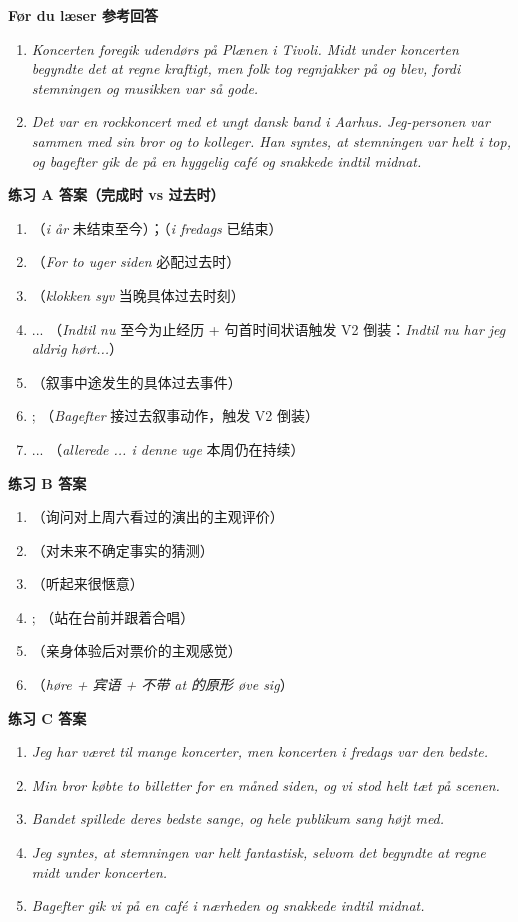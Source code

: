 \begin{answerbox}
\textbf{Før du læser 参考回答}
\begin{enumerate}
  \item \textit{Koncerten foregik udendørs på Plænen i Tivoli. Midt under koncerten begyndte det at regne kraftigt, men folk tog regnjakker på og blev, fordi stemningen og musikken var så gode.}
  \item \textit{Det var en rockkoncert med et ungt dansk band i Aarhus. Jeg-personen var sammen med sin bror og to kolleger. Han syntes, at stemningen var helt i top, og bagefter gik de på en hyggelig café og snakkede indtil midnat.}
\end{enumerate}

\textbf{练习 A 答案（完成时 vs 过去时）}
\begin{enumerate}
  \item {}（\textit{i år} 未结束至今）；（\textit{i fredags} 已结束）
  \item {}（\textit{For to uger siden} 必配过去时）
  \item {}（\textit{klokken syv} 当晚具体过去时刻）
  \item {} ... （\textit{Indtil nu} 至今为止经历 + 句首时间状语触发 V2 倒装：\textit{Indtil nu har jeg aldrig hørt...}）
  \item {}（叙事中途发生的具体过去事件）
  \item {}; （\textit{Bagefter} 接过去叙事动作，触发 V2 倒装）
  \item {} ... （\textit{allerede ... i denne uge} 本周仍在持续）
\end{enumerate}

\textbf{练习 B 答案}
\begin{enumerate}
  \item {}（询问对上周六看过的演出的主观评价）
  \item {}（对未来不确定事实的猜测）
  \item {}（听起来很惬意）
  \item {}; （站在台前并跟着合唱）
  \item {}（亲身体验后对票价的主观感觉）
  \item {}（\textit{høre + 宾语 + 不带 at 的原形 øve sig}）
\end{enumerate}

\textbf{练习 C 答案}
\begin{enumerate}
  \item \textit{Jeg har været til mange koncerter, men koncerten i fredags var den bedste.}
  \item \textit{Min bror købte to billetter for en måned siden, og vi stod helt tæt på scenen.}
  \item \textit{Bandet spillede deres bedste sange, og hele publikum sang højt med.}
  \item \textit{Jeg syntes, at stemningen var helt fantastisk, selvom det begyndte at regne midt under koncerten.}
  \item \textit{Bagefter gik vi på en café i nærheden og snakkede indtil midnat.}
\end{enumerate}


\end{answerbox}

